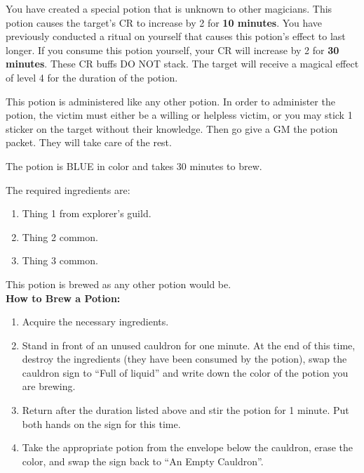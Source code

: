 \documentclass[green]{NeptuneBall}
\begin{document}
\name{\gBuff{}}

You have created a special potion that is unknown to other magicians. This potion causes the target's CR to increase by 2 for {\bf 10 minutes}.  You have previously conducted a ritual on yourself that causes this potion's effect to last longer. If you consume this potion yourself, your CR will increase by 2 for {\bf 30 minutes}. These CR buffs DO NOT stack. The target will receive a magical effect of level 4 for the duration of the potion.

This potion is administered like any other potion. In order to administer the potion, the victim must either be a willing or helpless victim, or you may stick 1 sticker on the target without their knowledge. Then go give a GM the potion packet. They will take care of the rest.

The potion is BLUE in color and takes 30 minutes to brew. 

The required ingredients are:
\begin{enumerate}
\item Thing 1 from explorer's guild.
\item Thing 2 common.
\item Thing 3 common.
\end{enumerate}

This potion is brewed as any other potion would be.\\

{\bf How to Brew a Potion:}\\ %
\begin{enumerate}
  \item Acquire the necessary ingredients.
  \item Stand in front of an unused cauldron for one minute. At the end of this time, destroy the ingredients (they have been consumed by the potion), swap the cauldron sign to ``Full of liquid'' and write down the color of the potion you are brewing.
  \item Return after the duration listed above and stir the potion for 1 minute. Put both hands on the sign for this time.
  \item Take the appropriate potion from the envelope below the cauldron, erase the color, and swap the sign back to ``An Empty Cauldron''.
\end{enumerate}
\end{document}
